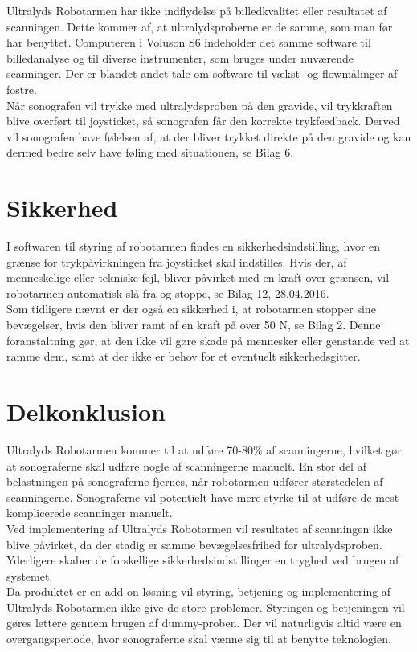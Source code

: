 Ultralyds Robotarmen har ikke indflydelse på billedkvalitet eller resultatet af scanningen. Dette kommer af, at ultralydsproberne er de samme, som man før har benyttet. Computeren i Voluson S6 indeholder det samme software til billedanalyse og til diverse instrumenter, som bruges under nuværende scanninger. Der er blandet andet tale om software til vækst- og flowmålinger af fostre. \\
Når sonografen vil trykke med ultralydsproben på den gravide, vil trykkraften blive overført til joysticket, så sonografen får den korrekte trykfeedback. Derved vil sonografen have følelsen af, at der bliver trykket direkte på den gravide og kan dermed bedre selv have føling med situationen, se Bilag 6. 

\section{Sikkerhed}
I softwaren til styring af robotarmen findes en sikkerhedsindstilling, hvor en grænse for trykpåvirkningen fra joysticket skal indstilles. Hvis der, af menneskelige eller tekniske fejl, bliver påvirket med en kraft over grænsen, vil robotarmen automatisk slå fra og stoppe, se Bilag 12, 28.04.2016. \\
Som tidligere nævnt er der også en sikkerhed i, at robotarmen stopper sine bevægelser, hvis den bliver ramt af en kraft på over 50 N, se Bilag 2. Denne foranstaltning gør, at den ikke vil gøre skade på mennesker eller genstande ved at ramme dem, samt at der ikke er behov for et eventuelt sikkerhedsgitter. 

\section{Delkonklusion}
Ultralyds Robotarmen kommer til at udføre 70-80\% af scanningerne, hvilket gør at sonograferne skal udføre nogle af scanningerne manuelt. En stor del af belastningen på sonograferne fjernes, når robotarmen udfører størstedelen af scanningerne. Sonograferne vil potentielt have mere styrke til at udføre de mest komplicerede scanninger manuelt. \\
Ved implementering af Ultralyds Robotarmen vil resultatet af scanningen ikke blive påvirket, da der stadig er samme bevægelsesfrihed for ultralydsproben. Yderligere skaber de forskellige sikkerhedsindstillinger en tryghed ved brugen af systemet.\\ 
Da produktet er en add-on løsning vil styring, betjening og implementering af Ultralyds Robotarmen ikke give de store problemer. Styringen og betjeningen vil gøres lettere gennem brugen af dummy-proben.  
Der vil naturligvis altid være en overgangsperiode, hvor sonograferne skal vænne sig til at benytte teknologien. 


